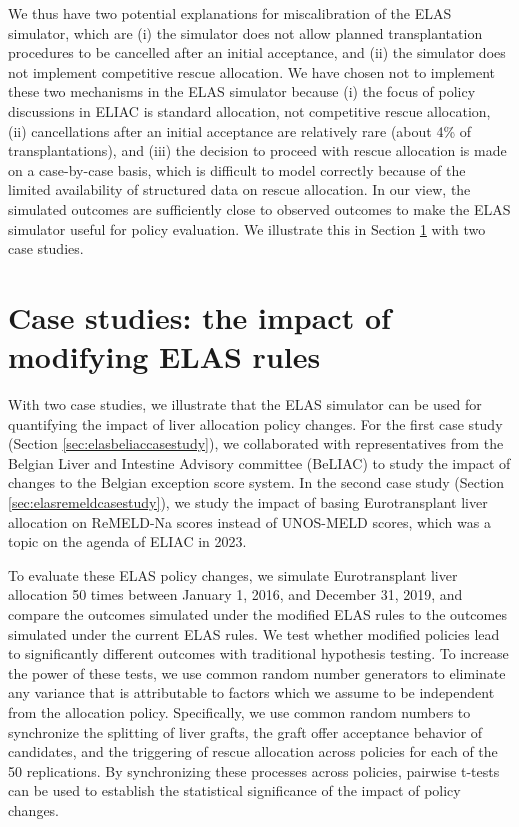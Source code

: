 \documentclass[11pt,twoside,]{book}
\begin{document}
\newpage
We thus have two potential explanations for miscalibration of the ELAS
simulator, which are (i) the simulator does not allow planned
transplantation procedures to be cancelled after an initial acceptance,
and (ii) the simulator does not implement competitive rescue allocation.
We have chosen not to implement these two mechanisms in the ELAS
simulator because (i) the focus of policy discussions in ELIAC is standard
allocation, not competitive rescue allocation, (ii) cancellations after an
initial acceptance are relatively rare (about 4\% of transplantations),
and (iii) the decision to proceed with rescue allocation is made on a case-by-case
basis, which is difficult to model correctly because of the limited availability
of structured data on rescue allocation. In our view, the simulated outcomes are
sufficiently close to observed outcomes to make the ELAS simulator useful
for policy evaluation. We illustrate this in Section \ref{sec:elascasestudies}
with two case studies.
\vspace*{-1em}

\section{Case studies: the impact of modifying ELAS rules}\label{sec:elascasestudies}

With two case studies, we illustrate that the ELAS simulator can be used
for quantifying the impact of liver allocation policy changes. For the first case study (Section
\ref{sec:elasbeliaccasestudy}), we
collaborated with representatives from the Belgian Liver and Intestine
Advisory committee (BeLIAC) to study the impact of changes to the
Belgian exception score system. In the second case study (Section \ref{sec:elasremeldcasestudy}), we study the
impact of basing Eurotransplant liver allocation on ReMELD-Na scores
instead of UNOS-MELD scores, which was a topic on the agenda of ELIAC in
2023.

To evaluate these ELAS policy changes, we simulate Eurotransplant liver
allocation 50 times between January 1, 2016, and December 31, 2019, and compare
the outcomes simulated under the modified ELAS rules to the outcomes simulated
under the current ELAS rules. We test whether modified policies lead to
significantly different outcomes with traditional hypothesis testing. To
increase the power of these tests, we use common random number
generators \citep{lawSimulationModelingAnalysis2015} to eliminate any variance that is
attributable to factors which we
assume to be independent from the allocation policy. Specifically, we use common random
numbers to synchronize the splitting of liver grafts, the graft offer
acceptance behavior of candidates, and the triggering of rescue
allocation across policies for each of the 50 replications. By
synchronizing these processes across policies, pairwise t-tests can be used
to establish the statistical significance of the impact of policy changes.
\end{document}
